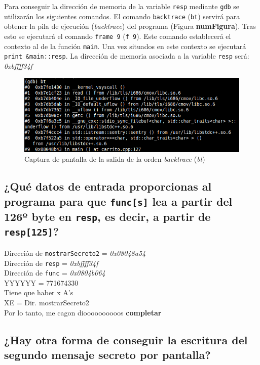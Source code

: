 \documentclass[10pt,a4paper]{article}
\begin{document}
Para conseguir la dirección de memoria de la variable \texttt{resp} mediante \texttt{gdb} se utilizarán los siguientes comandos. El comando \texttt{backtrace} (\texttt{bt}) servirá para obtener la pila de ejecución (\emph{backtrace}) del programa (Figura \textbf{numFigura}). Tras esto se ejecutará el comando \texttt{frame 9} (\texttt{f 9}). Este comando establecerá el contexto al de la función \texttt{main}. Una vez situados en este contexto se ejecutará \texttt{print \&{}main::resp}. La dirección de memoria asociada a la variable \texttt{resp} será: \emph{0xbffff34f}\\

\begin{figure}[h!]
\centering
\includegraphics[scale=0.8]{images/bt.png}
\caption{Captura de pantalla de la salida de la orden \emph{backtrace} (\emph{bt})}
\label{fig:bt}
\end{figure}


\subsection{¿Qué datos de entrada proporcionas al programa para que \texttt{func[s]} lea a partir del 126º byte en \texttt{resp}, es decir, a partir de \texttt{resp[125]}?}

Dirección de \texttt{mostrarSecreto2} = \emph{0x08048a54}\\
Dirección de \texttt{resp} = \emph{0xbffff34f}\\
Dirección de \texttt{func} = \emph{0x0804b064}\\

YYYYYY = 771674330\\
Tiene que haber x A's\\
XE = Dir. mostrarSecreto2\\

Por lo tanto, me cagon dioooooooooos \textbf{completar}\\



\subsection{¿Hay otra forma de conseguir la escritura del segundo mensaje secreto por pantalla?}
\end{document}
